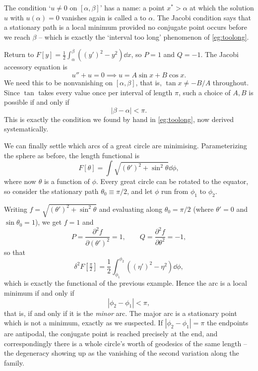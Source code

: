 \documentclass[a4paper]{scrartcl}
\begin{document}
The condition `$u \neq 0$ on $[\alpha,\beta]$' has a name: a point $x^* > \alpha$ at which the solution $u$ with $u(\alpha) = 0$ vanishes again is called a  to $\alpha$. The Jacobi condition says that a stationary path is a local minimum provided no conjugate point occurs before we reach $\beta$ -- which is exactly the `interval too long' phenomenon of \autoref{eg:toolong}.

\begin{example}
	Return to $F[y] = \frac{1}{2}\int_\alpha^\beta\left((y')^2 - y^2\right)\dd x$, so $P = 1$ and $Q = -1$. The Jacobi accessory equation is
	$$
	u'' + u = 0 \implies u = A\sin x + B\cos x.
	$$
	We need this to be nonvanishing on $[\alpha, \beta]$, that is, $\tan x \neq -B/A$ throughout. Since $\tan$ takes every value once per interval of length $\pi$, such a choice of $A, B$ is possible if and only if
	$$
	|\beta - \alpha| < \pi.
	$$
	This is exactly the condition we found by hand in \autoref{eg:toolong}, now derived systematically.
\end{example}

\begin{example}
	We can finally settle which arcs of a great circle are minimising. Parameterizing the sphere as before, the length functional is
	$$
	F[\theta] = \int \sqrt{(\theta')^2 + \sin^2\theta}\dd\phi,
	$$
	where now $\theta$ is a function of $\phi$. Every great circle can be rotated to the equator, so consider the stationary path $\theta_0 \equiv \pi/2$, and let $\phi$ run from $\phi_1$ to $\phi_2$.

	Writing $f = \sqrt{(\theta')^2 + \sin^2\theta}$ and evaluating along $\theta_0 = \pi/2$ (where $\theta' = 0$ and $\sin\theta_0 = 1$), we get $f = 1$ and
	$$
	P = \frac{\partial^2 f}{\partial(\theta')^2} = 1, \qquad Q = \frac{\partial^2 f}{\partial\theta^2} = -1,
	$$
	so that
	$$
	\delta^2 F\left[\tfrac{\pi}{2}\right] = \frac{1}{2}\int_{\phi_1}^{\phi_2}\left((\eta')^2 - \eta^2\right)\dd\phi,
	$$
	which is exactly the functional of the previous example. Hence the arc is a local minimum if and only if
	$$
	|\phi_2 - \phi_1| < \pi,
	$$
	that is, if and only if it is the \emph{minor} arc. The major arc is a stationary point which is not a minimum, exactly as we suspected. If $|\phi_2 - \phi_1| = \pi$ the endpoints are antipodal, the conjugate point is reached precisely at the end, and correspondingly there is a whole circle's worth of geodesics of the same length -- the degeneracy showing up as the vanishing of the second variation along the family.
\end{example}
\end{document}
